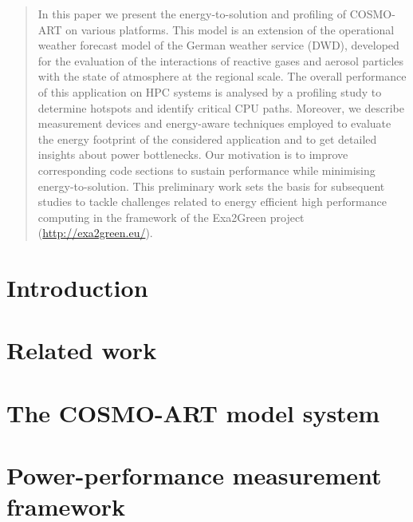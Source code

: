 \documentclass[twocolumn]{svjour3}
\begin{document}
\begin{abstract}
  In  this paper we  present the  energy-to-solution and  profiling of
  COSMO-ART on various  platforms.  This model is an  extension of the
  operational  weather forecast  model of  the German  weather service
  (DWD), developed for the  evaluation of the interactions of reactive
  gases  and aerosol  particles with  the state  of atmosphere  at the
  regional scale.  The overall  performance of this application on HPC
  systems is analysed  by a profiling study to  determine hotspots and
  identify  critical  CPU paths.   Moreover,  we describe  measurement
  devices and energy-aware techniques  employed to evaluate the energy
  footprint of the considered application and to get detailed insights
  about power bottlenecks.  Our motivation is to improve corresponding
  code    sections   to    sustain   performance    while   minimising
  energy-to-solution.   This  preliminary  work  sets  the  basis  for
  subsequent studies to tackle  challenges related to energy efficient
  high performance computing in the framework of the Exa2Green project
  (\url{http://exa2green.eu/}).

\end{abstract}

\section{Introduction}
\label{intro}


\section{Related work}
\label{sec:1}


\section{The COSMO-ART model system}
\label{sec:2}


\section{Power-performance measurement framework}
\label{sec:3}

\end{document}

